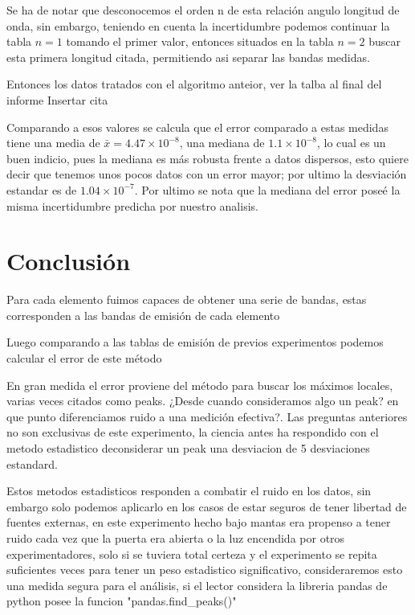\documentclass[a4paper,twocolumn,10pt]{article}
\begin{document}
Se ha de notar que desconocemos el orden n de esta relación angulo longitud de onda, sin embargo, teniendo en cuenta la incertidumbre podemos continuar la tabla $n=1$ tomando el primer valor, entonces situados en la tabla $n=2$ buscar esta primera longitud citada, permitiendo asi separar las bandas medidas.

Entonces los datos tratados con el algoritmo anteior, ver la talba al final del informe
Insertar cita

Comparando a esos valores se calcula que el error comparado a estas medidas tiene una media de $\bar x = 4.47\times 10^{-8}$, una mediana de $1.1 \times 10^{-8}$, lo cual es un buen indicio, pues la mediana es más robusta frente a datos dispersos, esto quiere decir que tenemos unos pocos datos con un error mayor; por ultimo la desviación estandar es de $1.04 \times 10^{-7}$. Por ultimo se nota que la mediana del error poseé la misma incertidumbre predicha por nuestro analisis.




\section{Conclusión}

Para cada elemento fuimos capaces de obtener una serie de bandas, estas corresponden a las bandas de emisión de cada elemento  


Luego comparando a las tablas de emisión de previos experimentos podemos calcular el error de este método 



En gran medida el error proviene del método para buscar los máximos locales, varias veces citados como peaks.
¿Desde cuando consideramos algo un peak? en que punto diferenciamos ruido a una medición efectiva?. Las preguntas anteriores no son exclusivas de este experimento, la ciencia antes ha respondido con el metodo estadistico deconsiderar un peak una desviacion de 5 desviaciones estandard.


Estos metodos estadisticos responden a combatir el ruido en los datos, sin embargo solo podemos aplicarlo en los casos de estar seguros de tener libertad de fuentes externas, en este experimento hecho bajo mantas era propenso a tener ruido cada vez que la puerta era abierta o la luz encendida por otros experimentadores, solo si se tuviera total certeza y el experimento se repita suficientes veces para tener un peso estadistico significativo, consideraremos esto una medida segura para el análisis, si el lector considera la libreria pandas de python posee la funcion "pandas.find\_peaks()"
\end{document}
